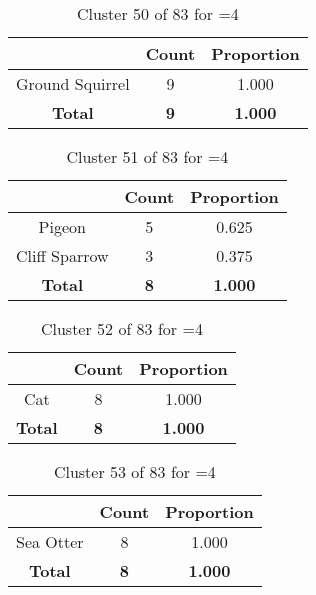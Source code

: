 \clearpage
\begin{table}[ht!]
\centering
\begin{tabular}{|c|c|c|}
\hline
\bf \Spec{} &\bf Count &\bf Proportion\\ \hline \hline
Ground Squirrel & 9 & 1.000\\ \hline
\hline
\bf Total & \bf 9 & \bf 1.000\\ \hline
\end{tabular}
\label{tab:cluster:50:4}
\caption{Cluster 50 of 83 for \minneigh{}=4}
\end{table}

\begin{table}[ht!]
\centering
\begin{tabular}{|c|c|c|}
\hline
\bf \Spec{} &\bf Count &\bf Proportion\\ \hline \hline
Pigeon & 5 & 0.625\\ \hline
Cliff Sparrow & 3 & 0.375\\ \hline
\hline
\bf Total & \bf 8 & \bf 1.000\\ \hline
\end{tabular}
\label{tab:cluster:51:4}
\caption{Cluster 51 of 83 for \minneigh{}=4}
\end{table}

\begin{table}[ht!]
\centering
\begin{tabular}{|c|c|c|}
\hline
\bf \Spec{} &\bf Count &\bf Proportion\\ \hline \hline
Cat & 8 & 1.000\\ \hline
\hline
\bf Total & \bf 8 & \bf 1.000\\ \hline
\end{tabular}
\label{tab:cluster:52:4}
\caption{Cluster 52 of 83 for \minneigh{}=4}
\end{table}

\begin{table}[ht!]
\centering
\begin{tabular}{|c|c|c|}
\hline
\bf \Spec{} &\bf Count &\bf Proportion\\ \hline \hline
Sea Otter & 8 & 1.000\\ \hline
\hline
\bf Total & \bf 8 & \bf 1.000\\ \hline
\end{tabular}
\label{tab:cluster:53:4}
\caption{Cluster 53 of 83 for \minneigh{}=4}
\end{table}


